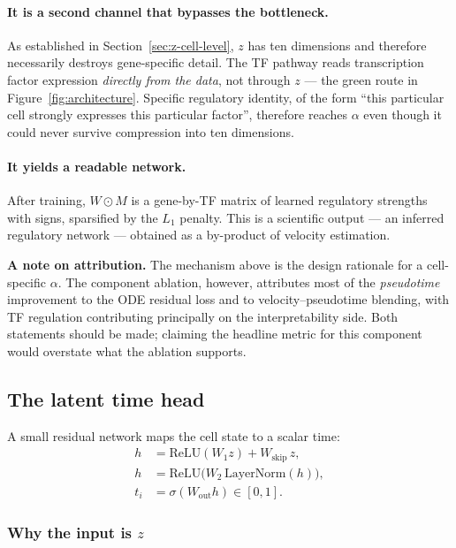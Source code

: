 \documentclass[11pt,a4paper]{article}
\newenvironment{keybox}{\begin{shaded}\noindent}{\end{shaded}}
\theoremstyle{definition}
\begin{document}
\paragraph{It is a second channel that bypasses the bottleneck.} As established
in Section~\ref{sec:z-cell-level}, $z$ has ten dimensions and therefore
necessarily destroys gene-specific detail. The TF pathway reads transcription
factor expression \emph{directly from the data}, not through $z$ --- the green
route in Figure~\ref{fig:architecture}. Specific regulatory identity, of the
form ``this particular cell strongly expresses this particular factor'',
therefore reaches $\alpha$ even though it could never survive compression into
ten dimensions.

\paragraph{It yields a readable network.} After training, $W \odot M$ is a
gene-by-TF matrix of learned regulatory strengths with signs, sparsified by the
$L_1$ penalty. This is a scientific output --- an inferred regulatory network
--- obtained as a by-product of velocity estimation.

\begin{keybox}
\textbf{A note on attribution.} The mechanism above is the design rationale for
a cell-specific $\alpha$. The component ablation, however, attributes most of
the \emph{pseudotime} improvement to the ODE residual loss and to
velocity--pseudotime blending, with TF regulation contributing principally on
the interpretability side. Both statements should be made; claiming the
headline metric for this component would overstate what the ablation supports.
\end{keybox}

\subsection{The latent time head}
\label{sec:time-head}

A small residual network maps the cell state to a scalar time:
%
\begin{align}
h &= \mathrm{ReLU}(W_1 z) + W_{\text{skip}}\, z, \\
h &= \mathrm{ReLU}\big(W_2\,\mathrm{LayerNorm}(h)\big), \\
t_i &= \sigma(W_{\text{out}} h) \in [0,1].
\end{align}

\subsubsection{Why the input is \texorpdfstring{$z$}{z}}
\end{document}
